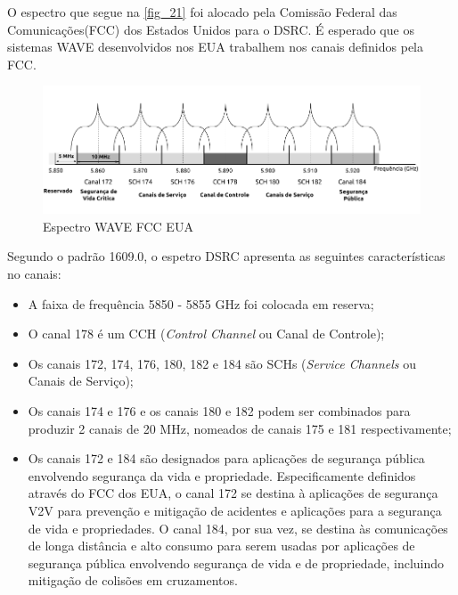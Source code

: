 \documentclass[
12pt,				%
openright,			%
oneside,			%
a4paper,			%
brazil,				%
]{abntex2}
\begin{document}
	\par O espectro que segue na \autoref{fig_21} foi alocado pela Comissão Federal das Comunicações(FCC) dos Estados Unidos para o DSRC. É esperado que os sistemas WAVE desenvolvidos nos EUA trabalhem nos canais definidos pela FCC.
	
	\begin{figure} [H]
		\centering
		\includegraphics[scale=.5]{figuras/cap3/21EspectroWAVEFCCUSA}
		\caption{\label{fig_21}Espectro WAVE FCC EUA}
	\end{figure}
	
	\par Segundo o padrão 1609.0, o espetro DSRC apresenta as seguintes características no canais:
	
	\begin{itemize}
		\item A faixa de frequência 5850 - 5855 GHz foi colocada em reserva;
		\item O canal 178 é um CCH (\textit{Control Channel} ou Canal de Controle);
		\item Os canais 172, 174, 176, 180, 182 e 184 são SCHs (\textit{Service Channels} ou Canais de Serviço);
		\item Os canais 174 e 176  e os canais 180 e 182 podem ser combinados para produzir 2 canais de 20 MHz, nomeados de canais 175 e 181 respectivamente;
		\item Os canais 172 e 184 são designados para aplicações de segurança pública envolvendo segurança da vida e propriedade. Especificamente definidos através do FCC dos EUA, o canal 172 se destina à aplicações de segurança V2V para prevenção e mitigação de acidentes e aplicações para a segurança de vida e propriedades. O canal 184, por sua vez, se destina às comunicações de longa distância e alto consumo para serem usadas por aplicações de segurança pública envolvendo segurança de vida e de propriedade, incluindo mitigação de colisões em cruzamentos.
	\end{itemize}
	
\end{document}
